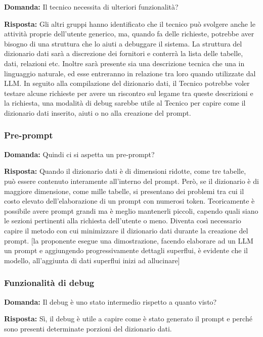 \textbf{Domanda:} Il tecnico necessita di ulteriori funzionalità?

\textbf{Risposta:} Gli altri gruppi hanno identificato che il tecnico può svolgere anche le attività proprie dell’utente generico, ma, quando fa delle richieste, potrebbe aver bisogno di una struttura che lo aiuti a debuggare il sistema.
La struttura del dizionario dati sarà a discrezione dei fornitori e conterrà la lista delle tabelle, dati, relazioni etc. Inoltre sarà presente sia una descrizione tecnica che una in linguaggio naturale, ed esse entreranno in relazione tra loro quando utilizzate dal LLM. In seguito alla compilazione del dizionario dati, il Tecnico potrebbe voler testare alcune richieste per avere un riscontro sul legame tra queste descrizioni e la richiesta, una modalità di debug sarebbe utile al Tecnico per capire come il dizionario dati inserito, aiuti o no alla creazione del prompt.


\subsubsection{Pre-prompt}

\textbf{Domanda:} Quindi ci si aspetta un pre-prompt?

\textbf{Risposta:} Quando il dizionario dati è di dimensioni ridotte, come tre tabelle, può essere contenuto interamente all’interno del prompt. Però, se il dizionario è di maggiore dimensione, come mille tabelle, si presentano dei problemi tra cui il costo elevato dell’elaborazione di un prompt con numerosi token. Teoricamente è possibile avere prompt grandi ma è meglio mantenerli piccoli, capendo quali siano le sezioni pertinenti alla richiesta dell’utente o meno. Diventa così necessario capire il metodo con cui minimizzare il dizionario dati durante la creazione del prompt.
[la proponente esegue una dimostrazione, facendo elaborare ad un LLM un prompt e aggiungendo progressivamente dettagli superflui, è evidente che il modello, all’aggiunta di dati superflui inizi ad allucinare]

\subsubsection{Funzionalità di debug}

\textbf{Domanda:} Il debug è uno stato intermedio rispetto a quanto visto?

\textbf{Risposta:} Sì, il debug è utile a capire come è stato generato il prompt e perché sono presenti determinate porzioni del dizionario dati.


